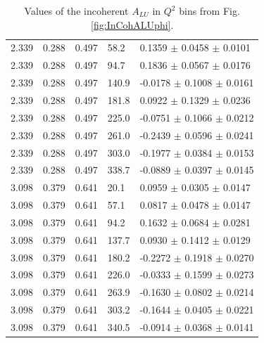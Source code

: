 \documentclass{article}
\begin{document}
\begin{table}[!h]
\begin{center}
\begin{tabular}{||l|l|l|l|l||}
  2.339 & 0.288 & 0.497  &  58.2  &  0.1359  $\pm$  0.0458  $\pm$ 0.0101 \\
  2.339 & 0.288 & 0.497  &  94.7  &  0.1836  $\pm$  0.0567  $\pm$ 0.0176 \\
  2.339 & 0.288 & 0.497  & 140.9  & -0.0178  $\pm$  0.1008  $\pm$ 0.0161 \\
  2.339 & 0.288 & 0.497  & 181.8  &  0.0922  $\pm$  0.1329  $\pm$ 0.0236 \\
  2.339 & 0.288 & 0.497  & 225.0  & -0.0751  $\pm$  0.1066  $\pm$ 0.0212 \\
  2.339 & 0.288 & 0.497  & 261.0  & -0.2439  $\pm$  0.0596  $\pm$ 0.0241 \\
  2.339 & 0.288 & 0.497  & 303.0  & -0.1977  $\pm$  0.0384  $\pm$ 0.0153 \\
  2.339 & 0.288 & 0.497  & 338.7  & -0.0889  $\pm$  0.0397  $\pm$ 0.0145 \\
  \hline                                                              
  3.098 & 0.379 & 0.641  & 20.1   & 0.0959   $\pm$  0.0305  $\pm$ 0.0147 \\ 
  3.098 & 0.379 & 0.641  & 57.1   & 0.0817   $\pm$  0.0478  $\pm$ 0.0147 \\
  3.098 & 0.379 & 0.641  & 94.2   & 0.1632   $\pm$  0.0684  $\pm$ 0.0281 \\
  3.098 & 0.379 & 0.641  &137.7   & 0.0930   $\pm$  0.1412  $\pm$ 0.0129 \\
  3.098 & 0.379 & 0.641  &180.2   &-0.2272   $\pm$  0.1918  $\pm$ 0.0270 \\
  3.098 & 0.379 & 0.641  &226.0   &-0.0333   $\pm$  0.1599  $\pm$ 0.0273 \\
  3.098 & 0.379 & 0.641  &263.9   &-0.1630   $\pm$  0.0802  $\pm$ 0.0214 \\
  3.098 & 0.379 & 0.641  &303.2   &-0.1644   $\pm$  0.0405  $\pm$ 0.0221 \\
  3.098 & 0.379 & 0.641  &340.5   &-0.0914   $\pm$  0.0368  $\pm$ 0.0141 \\
 \hline
 \hline
      \end{tabular}
      \caption{Values of the incoherent $A_{LU}$ in $Q^2$ bins from Fig. \ref{fig:InCohALUphi}.}
      \label{table:InCoh_Q2_BSA}
   \end{center}
\end{table}
\end{document}
